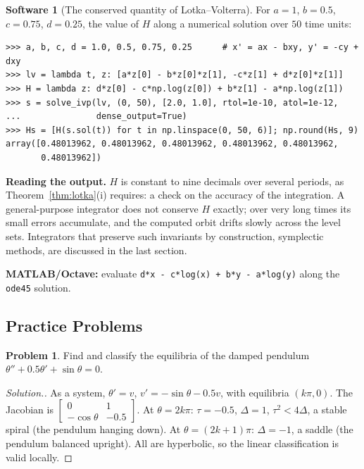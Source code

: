 \documentclass[11pt,a4paper]{article}
\numberwithin{equation}{section}
\theoremstyle{definition}
\newtheorem{software}[thm]{Software}
\newtheorem{problemx}{Problem}[subsection]
\newenvironment{problem}{\begin{problemx}}{\end{problemx}}
\newenvironment{solution}
  {\renewcommand{\qedsymbol}{}\begin{proof}[\textit{Solution}.]}
  {\end{proof}}
\begin{document}
\begin{software}[The conserved quantity of Lotka--Volterra]
\label{sw:lotka}
For $a = 1$, $b = 0.5$, $c = 0.75$, $d = 0.25$, the value of $H$ along a numerical solution over $50$ time units:
{\small\begin{verbatim}
>>> a, b, c, d = 1.0, 0.5, 0.75, 0.25      # x' = ax - bxy, y' = -cy + dxy
>>> lv = lambda t, z: [a*z[0] - b*z[0]*z[1], -c*z[1] + d*z[0]*z[1]]
>>> H = lambda z: d*z[0] - c*np.log(z[0]) + b*z[1] - a*np.log(z[1])
>>> s = solve_ivp(lv, (0, 50), [2.0, 1.0], rtol=1e-10, atol=1e-12,
...               dense_output=True)
>>> Hs = [H(s.sol(t)) for t in np.linspace(0, 50, 6)]; np.round(Hs, 9)
array([0.48013962, 0.48013962, 0.48013962, 0.48013962, 0.48013962,
       0.48013962])
\end{verbatim}}
\textbf{Reading the output.} $H$ is constant to nine decimals over several periods, as Theorem~\ref{thm:lotka}(i) requires: a check on the accuracy of the integration. A general-purpose integrator does not conserve
$H$ exactly; over very long times its small errors accumulate, and the computed orbit drifts slowly across the level sets. Integrators that preserve such invariants by construction,
symplectic methods, are discussed in the last section.

\textbf{MATLAB/Octave:} evaluate \texttt{d*x - c*log(x) + b*y - a*log(y)} along the \texttt{ode45} solution.
\end{software}

\subsection{Practice Problems}

\begin{problem}
Find and classify the equilibria of the damped pendulum $\theta'' + 0.5\theta' + \sin\theta = 0$.
\end{problem}

\begin{solution}
As a system, $\theta' = v$, $v' = -\sin\theta - 0.5v$, with equilibria $(k\pi, 0)$. The Jacobian is $\begin{bmatrix} 0 & 1\\ -\cos\theta & -0.5\end{bmatrix}$. At $\theta = 2k\pi$: $\tau = -0.5$, $\Delta = 1$, $\tau^2 < 4\Delta$, a stable spiral (the
pendulum hanging down). At $\theta = (2k + 1)\pi$: $\Delta = -1$, a saddle (the pendulum balanced upright). All are hyperbolic, so the linear classification is valid locally.
\end{solution}
\end{document}
